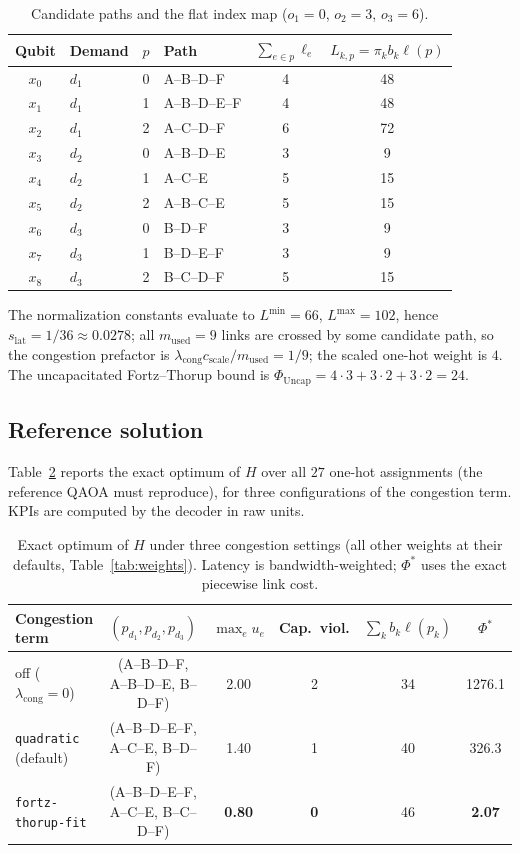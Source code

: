 \documentclass[11pt]{article}
\newcommand{\lat}{\mathrm{lat}}
\newcommand{\cng}{\mathrm{cong}}
\newcommand{\used}{\mathrm{used}}
\newcommand{\Uncap}{\mathrm{Uncap}}
\begin{document}
\begin{table}[ht]
\centering
\begin{tabular}{clclcc}
\toprule
Qubit & Demand & $p$ & Path & $\sum_{e\in p}\ell_e$ & $L_{k,p} = \pi_k b_k \ell(p)$ \\
\midrule
$x_0$ & $d_1$ & 0 & A--B--D--F     & 4 & 48 \\
$x_1$ & $d_1$ & 1 & A--B--D--E--F  & 4 & 48 \\
$x_2$ & $d_1$ & 2 & A--C--D--F     & 6 & 72 \\
$x_3$ & $d_2$ & 0 & A--B--D--E     & 3 & 9  \\
$x_4$ & $d_2$ & 1 & A--C--E        & 5 & 15 \\
$x_5$ & $d_2$ & 2 & A--B--C--E     & 5 & 15 \\
$x_6$ & $d_3$ & 0 & B--D--F        & 3 & 9  \\
$x_7$ & $d_3$ & 1 & B--D--E--F     & 3 & 9  \\
$x_8$ & $d_3$ & 2 & B--C--D--F     & 5 & 15 \\
\bottomrule
\end{tabular}
\caption{Candidate paths and the flat index map ($o_1 = 0$, $o_2 = 3$,
$o_3 = 6$).}
\label{tab:indexmap}
\end{table}

The normalization constants evaluate to $L^{\min} = 66$, $L^{\max} = 102$,
hence $s_{\lat} = 1/36 \approx 0.0278$; all $m_{\used} = 9$ links are crossed by some
candidate path, so the congestion prefactor is
$\lambda_{\cng} c_{\mathrm{scale}} / m_{\used} = 1/9$; the scaled one-hot
weight is $4$. The uncapacitated Fortz--Thorup bound is
$\Phi_{\Uncap} = 4\cdot3 + 3\cdot2 + 3\cdot2 = 24$.

\subsection{Reference solution}

Table~\ref{tab:results} reports the exact optimum of $H$ over all $27$
one-hot assignments (the reference QAOA must reproduce), for three
configurations of the congestion term. KPIs are computed by the decoder in
raw units.

\begin{table}[ht]
\centering
\small
\begin{tabular}{lccccc}
\toprule
Congestion term & $(p_{d_1}, p_{d_2}, p_{d_3})$ & $\max_e u_e$ &
Cap.\ viol. & $\sum_k b_k \ell(p_k)$ & $\Phi^{*}$ \\
\midrule
off ($\lambda_{\cng}=0$)
  & (A--B--D--F,\; A--B--D--E,\; B--D--F) & 2.00 & 2 & 34 & 1276.1 \\
\texttt{quadratic} (default)
  & (A--B--D--E--F,\; A--C--E,\; B--D--F) & 1.40 & 1 & 40 & 326.3 \\
\texttt{fortz-thorup-fit}
  & (A--B--D--E--F,\; A--C--E,\; B--C--D--F) & \textbf{0.80} & \textbf{0} & 46 & \textbf{2.07} \\
\bottomrule
\end{tabular}
\caption{Exact optimum of $H$ under three congestion settings (all other
weights at their defaults, Table~\ref{tab:weights}). Latency is
bandwidth-weighted; $\Phi^{*}$ uses the exact piecewise link cost.}
\label{tab:results}
\end{table}
\end{document}
